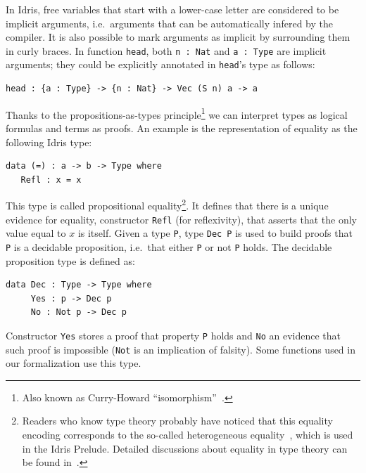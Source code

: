 \documentclass{llncs}
\newcommand{\idris}[1]{\texttt{#1}}%
\begin{document}
In Idris, free variables that start with a lower-case letter are
considered to be implicit arguments, i.e.~arguments that can be
automatically infered by the compiler. It is also possible to mark
arguments as implicit by surrounding them in curly braces. In function
\idris{head}, both \idris{n : Nat} and \idris{a : Type} are implicit
arguments; they could be explicitly annotated in \idris{head}'s type
as follows:
\begin{verbatim}
head : {a : Type} -> {n : Nat} -> Vec (S n) a -> a
\end{verbatim}

Thanks to the propositions-as-types principle\footnote{Also known as
  Curry-Howard ``isomorphism''~\cite{Sorensen2006}.} we can interpret
types as logical formulas and terms as proofs. An example is the
representation of equality as the following Idris type:
\begin{verbatim}
data (=) : a -> b -> Type where
   Refl : x = x
\end{verbatim}
This type is called propositional equality\footnote{Readers who know
  type theory probably have noticed that this equality encoding
  corresponds to the so-called heterogeneous
  equality~\cite{McBride1999}, which is used in the Idris
  Prelude. Detailed discussions about equality in type theory can be
  found in~\cite{Hott}.}. It defines that there is a unique evidence
for equality, constructor \idris{Refl} (for reflexivity), that asserts
that the only value equal to $x$ is itself. Given a type \idris{P},
type \idris{Dec P} is used to build proofs that \idris{P} is a
decidable proposition, i.e.~that either \idris{P} or not \idris{P}
holds. The decidable proposition type is defined as:
\begin{verbatim}
data Dec : Type -> Type where
     Yes : p -> Dec p
     No : Not p -> Dec p
\end{verbatim}
Constructor \idris{Yes} stores a proof that property \idris{P} holds
and \idris{No} an evidence that such proof is impossible (\idris{Not}
is an implication of falsity). Some functions used in our
formalization use this type.
\end{document}
